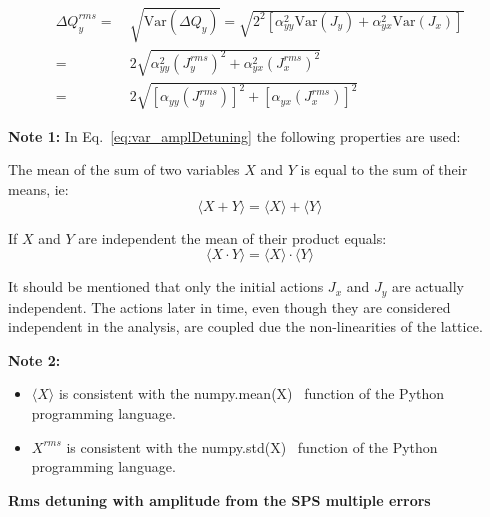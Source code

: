\begin{equation}\label{rms_amplitude_detuning}
    \begin{split}
    \Delta Q^{rms}_y = &~\sqrt{\mathrm{Var}(\Delta Q_y)}=\sqrt{2^2\left [ \alpha_{yy}^2 \mathrm{Var}(J_y) + \alpha_{yx}^2 \mathrm{Var}(J_x) \right ]}\\
    =&~2 \sqrt{\alpha_{yy}^2 (J^{rms}_y)^2 + \alpha_{yx}^2 (J^{rms}_x)^2 }\\
    =&~2 \sqrt{\left [\alpha_{yy} (J^{rms}_y)\right ]^2 + \left [ \alpha_{yx} (J^{rms}_x) \right ]^2 }
    \end{split}
\end{equation}

\textbf{Note 1:} In Eq.~\ref{eq:var_amplDetuning} the following properties are used:

The mean of the sum of two variables $X$ and $Y$ is equal to the sum of their means, ie:
\begin{equation}\label{eq:mean_of_sum_property}
    \langle X+Y \rangle = \langle X \rangle + \langle Y \rangle
\end{equation}

If $X$ and $Y$ are independent the mean of their product equals:
\begin{equation}\label{eq:mean_of_product_property}
    \langle X \cdot Y \rangle = \langle X \rangle \cdot  \langle Y \rangle
\end{equation}

It should be mentioned that only the initial actions $J_x$ and $J_y$ are actually independent. The actions later in time, even though they are considered independent in the analysis, are coupled due the non-linearities of the lattice.

\textbf{Note 2:}
\begin{itemize}
    \item $\langle X \rangle$ is consistent with the numpy.mean(X)~\cite{numpy_mean} function of the Python programming language.
    \item $X^{rms}$ is consistent with the numpy.std(X)~\cite{numpy_std} function of the Python programming language. 
\end{itemize}



\normalsize{\textbf{Rms detuning with amplitude from the SPS multiple errors}}\\